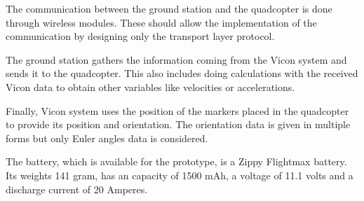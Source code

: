 The communication between the ground station and the quadcopter is done through wireless modules. These should allow the implementation of the communication by designing only the transport layer protocol.

The ground station gathers the information coming from the Vicon system and sends it to the quadcopter. This also includes doing calculations with the received Vicon data to obtain other variables like velocities or accelerations.

Finally, Vicon system uses the position of the markers placed in the quadcopter to provide its position and orientation. The orientation data is given in multiple forms but only Euler angles data is considered.

The battery, which is available for the prototype, is a Zippy Flightmax battery. Its weights 141 gram, has an capacity of 1500 mAh, a voltage of 11.1 volts and a discharge current of 20 Amperes. 



